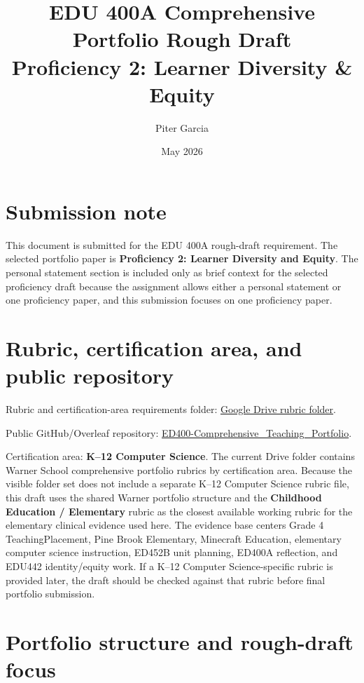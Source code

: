 \documentclass[12pt]{article}
\title{EDU 400A Comprehensive Portfolio Rough Draft\\\large Proficiency 2: Learner Diversity \& Equity}
\author{Piter Garcia}
\date{May 2026}
\begin{document}
\maketitle

\section*{Submission note}

This document is submitted for the EDU 400A rough-draft requirement. The selected portfolio paper is \textbf{Proficiency 2: Learner Diversity and Equity}. The personal statement section is included only as brief context for the selected proficiency draft because the assignment allows either a personal statement or one proficiency paper, and this submission focuses on one proficiency paper.

\section*{Rubric, certification area, and public repository}

Rubric and certification-area requirements folder: \href{https://drive.google.com/drive/folders/1AHOAh-MUIWg-2xVZXCz6hDzydanlecPe}{Google Drive rubric folder}.

Public GitHub/Overleaf repository: \href{https://github.com/pzg8794/ED400-Comprehensive_Teaching_Portfolio}{ED400-Comprehensive\_Teaching\_Portfolio}.

Certification area: \textbf{K--12 Computer Science}. The current Drive folder contains Warner School comprehensive portfolio rubrics by certification area. Because the visible folder set does not include a separate K--12 Computer Science rubric file, this draft uses the shared Warner portfolio structure and the \textbf{Childhood Education / Elementary} rubric as the closest available working rubric for the elementary clinical evidence used here. The evidence base centers Grade 4 TeachingPlacement, Pine Brook Elementary, Minecraft Education, elementary computer science instruction, ED452B unit planning, ED400A reflection, and EDU442 identity/equity work. If a K--12 Computer Science-specific rubric is provided later, the draft should be checked against that rubric before final portfolio submission.

\tableofcontents
\newpage

\section{Portfolio structure and rough-draft focus}
\end{document}
